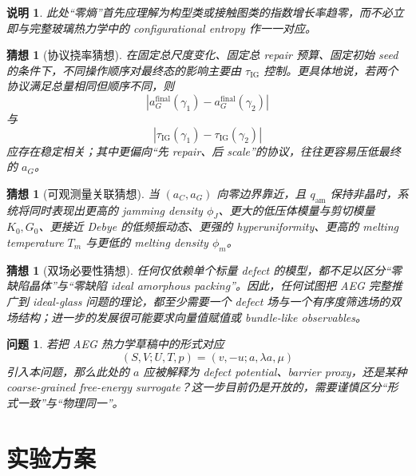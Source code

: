 \documentclass[12pt]{ctexart}
\newtheorem{conjecture}[definition]{猜想}
\newtheorem{remark}[definition]{说明}
\newtheorem{question}[definition]{问题}
\newcommand{\IG}{\mathrm{IG}}
\begin{document}
\begin{remark}
此处“零熵”首先应理解为构型类或接触图类的指数增长率趋零，而不必立即与完整玻璃热力学中的 configurational entropy 作一一对应。
\end{remark}

\begin{conjecture}[协议挠率猜想]
在固定总尺度变化、固定总 repair 预算、固定初始 seed 的条件下，不同操作顺序对最终态的影响主要由 $\tau_{\IG}$ 控制。更具体地说，若两个协议满足总量相同但顺序不同，则
\begin{equation}
|a_G^{\mathrm{final}}(\gamma_1)-a_G^{\mathrm{final}}(\gamma_2)|
\end{equation}
与
\begin{equation}
|\tau_{\IG}(\gamma_1)-\tau_{\IG}(\gamma_2)|
\end{equation}
应存在稳定相关；其中更偏向“先 repair、后 scale”的协议，往往更容易压低最终的 $a_G$。
\end{conjecture}

\begin{conjecture}[可观测量关联猜想]
当 $(a_C,a_G)$ 向零边界靠近，且 $q_{\mathrm{am}}$ 保持非晶时，系统将同时表现出更高的 jamming density $\phi_J$、更大的低压体模量与剪切模量 $K_0,G_0$、更接近 Debye 的低频振动态、更强的 hyperuniformity、更高的 melting temperature $T_m$ 与更低的 melting density $\phi_m$。
\end{conjecture}

\begin{conjecture}[双场必要性猜想]
任何仅依赖单个标量 defect 的模型，都不足以区分“零缺陷晶体”与“零缺陷 ideal amorphous packing”。因此，任何试图把 AEG 完整推广到 ideal-glass 问题的理论，都至少需要一个 defect 场与一个有序度筛选场的双场结构；进一步的发展很可能要求向量值赋值或 bundle-like observables。
\end{conjecture}

\begin{question}
若把 AEG 热力学草稿中的形式对应
\begin{equation}
(S,V;U,T,p)=(v,-u;a,\lambda a,\mu)
\end{equation}
引入本问题，那么此处的 $a$ 应被解释为 defect potential、barrier proxy，还是某种 coarse-grained free-energy surrogate？这一步目前仍是开放的，需要谨慎区分“形式一致”与“物理同一”。
\end{question}

\section{实验方案}
\end{document}
